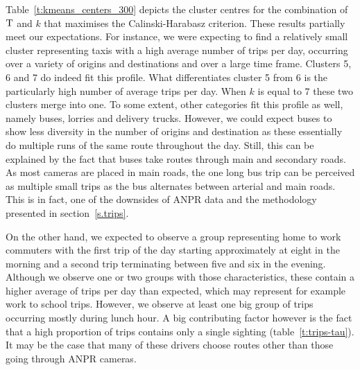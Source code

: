Table~\ref{t:kmeans_centers_300} depicts the cluster centres for the combination of $\mathrm{T}$ and $k$ that maximises the Calinski-Harabasz criterion. These results partially meet our expectations. For instance, we were expecting to find a relatively small cluster representing taxis with a high average number of trips per day, occurring over a variety of origins and destinations and over a large time frame. Clusters 5, 6 and 7 do indeed fit this profile. What differentiates cluster 5 from 6 is the particularly high number of average trips per day. When $k$ is equal to 7 these two clusters merge into one. To some extent, other categories fit this profile as well, namely buses, lorries and delivery trucks. However, we could expect buses to show less diversity in the number of origins and destination as these essentially do multiple runs of the same route throughout the day. Still, this can be explained by the fact that buses take routes through main and secondary roads. As most cameras are placed in main roads, the one long bus trip can be perceived as multiple small trips as the bus alternates between arterial and main roads. This is in fact, one of the downsides of ANPR data and the methodology presented in section~\ref{s.trips}.

On the other hand, we expected to observe a group representing home to work commuters with the first trip of the day starting approximately at eight in the morning and a second trip terminating between five and six in the evening. Although we observe one or two groups with those characteristics, these contain a higher average of trips per day than expected, which may represent for example work to school trips. However, we observe at least one big group of trips occurring mostly during lunch hour. A big contributing factor however is the fact that a high proportion of trips contains only a single sighting (table~\ref{t:trips-tau}). It may be the case that many of these drivers choose routes other than those going through ANPR cameras.

